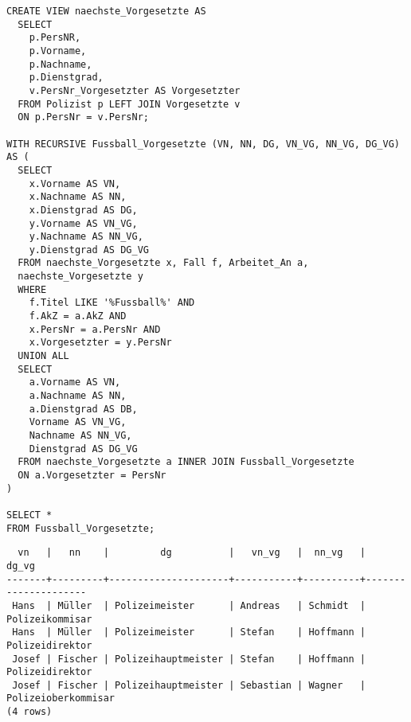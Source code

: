 \documentclass{bschlangaul-aufgabe}
\begin{document}
\begin{enumerate}
\begin{liAntwort}

\begin{verbatim}
CREATE VIEW naechste_Vorgesetzte AS
  SELECT
    p.PersNR,
    p.Vorname,
    p.Nachname,
    p.Dienstgrad,
    v.PersNr_Vorgesetzter AS Vorgesetzter
  FROM Polizist p LEFT JOIN Vorgesetzte v
  ON p.PersNr = v.PersNr;

WITH RECURSIVE Fussball_Vorgesetzte (VN, NN, DG, VN_VG, NN_VG, DG_VG) AS (
  SELECT
    x.Vorname AS VN,
    x.Nachname AS NN,
    x.Dienstgrad AS DG,
    y.Vorname AS VN_VG,
    y.Nachname AS NN_VG,
    y.Dienstgrad AS DG_VG
  FROM naechste_Vorgesetzte x, Fall f, Arbeitet_An a,
  naechste_Vorgesetzte y
  WHERE
    f.Titel LIKE '%Fussball%' AND
    f.AkZ = a.AkZ AND
    x.PersNr = a.PersNr AND
    x.Vorgesetzter = y.PersNr
  UNION ALL
  SELECT
    a.Vorname AS VN,
    a.Nachname AS NN,
    a.Dienstgrad AS DB,
    Vorname AS VN_VG,
    Nachname AS NN_VG,
    Dienstgrad AS DG_VG
  FROM naechste_Vorgesetzte a INNER JOIN Fussball_Vorgesetzte
  ON a.Vorgesetzter = PersNr
)

SELECT *
FROM Fussball_Vorgesetzte;
\end{verbatim}

\begin{verbatim}
  vn   |   nn    |         dg          |   vn_vg   |  nn_vg   |        dg_vg
-------+---------+---------------------+-----------+----------+---------------------
 Hans  | Müller  | Polizeimeister      | Andreas   | Schmidt  | Polizeikommisar
 Hans  | Müller  | Polizeimeister      | Stefan    | Hoffmann | Polizeidirektor
 Josef | Fischer | Polizeihauptmeister | Stefan    | Hoffmann | Polizeidirektor
 Josef | Fischer | Polizeihauptmeister | Sebastian | Wagner   | Polizeioberkommisar
(4 rows)
\end{verbatim}

\end{liAntwort}
\end{enumerate}
\end{document}
